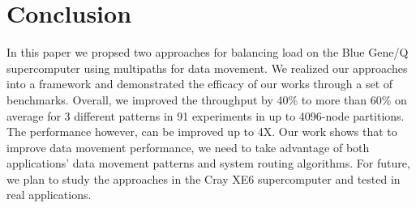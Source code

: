 \section{Conclusion}
\label{sec:conclusion}

In this paper we propsed two approaches for balancing load on the Blue Gene/Q supercomputer using multipaths for data movement. We realized our approaches into a framework and demonstrated the efficacy of our works through a set of benchmarks. Overall, we improved the throughput by 40\% to more than 60\% on average for 3 different patterns in 91 experiments in up to 4096-node partitions. The performance however, can be improved up to 4X. Our work shows that to improve data movement performance, we need to take advantage of both applications' data movement patterns and system routing algorithms. For future, we plan to study the approaches in the Cray XE6 supercomputer and tested in real applications.
